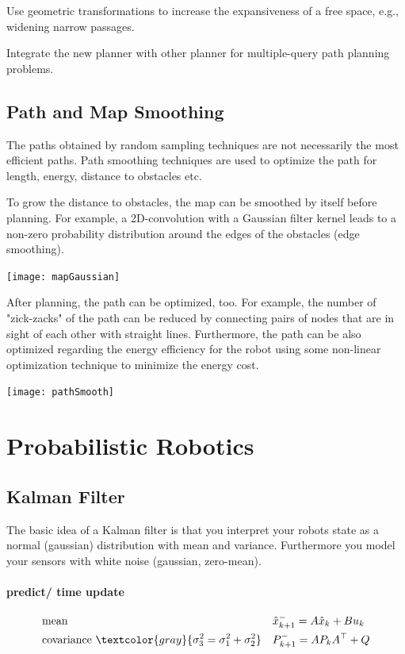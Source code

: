 \begin{multicols*}{2}
Use geometric transformations to increase the
expansiveness of a free space, e.g., widening narrow
passages.

Integrate the new planner with other planner for
multiple-query path planning problems.



\subsection{Path and Map Smoothing}
The paths obtained by random sampling techniques are not necessarily the most efficient paths. Path smoothing techniques are used to optimize the path for length, energy, distance to obstacles etc. 

To grow the distance to obstacles, the map can be smoothed by itself before planning. For example, a 2D-convolution with a Gaussian filter kernel leads to a non-zero probability distribution around the edges of the obstacles (edge smoothing).

\texttt{[image: mapGaussian]}
 
After planning, the path can be optimized, too. For example, the number of "zick-zacks" of the path can be reduced by connecting pairs of nodes that are in sight of each other with straight lines. Furthermore, the path can be also optimized regarding the energy efficiency for the robot using some non-linear optimization technique to minimize the energy cost.

\texttt{[image: pathSmooth]}

\section{Probabilistic Robotics}

\subsection{Kalman Filter}

The basic idea of a Kalman filter is that you interpret your robots state as a normal (gaussian) distribution with mean and variance. Furthermore you model your sensors with white noise (gaussian, zero-mean).

\paragraph{predict/ time update}

\begin{align}
	&\text{mean} && \hat{x}_{k+1}^- = A \hat{x}_{k} + B u_k  \\
	&\text{covariance } \textcolor{gray}{\sigma_3^2 = \sigma_1^2 + \sigma_2^2} && P_{k+1}^- = A P_k A^\top + Q 
\end{align}


\end{multicols*}
